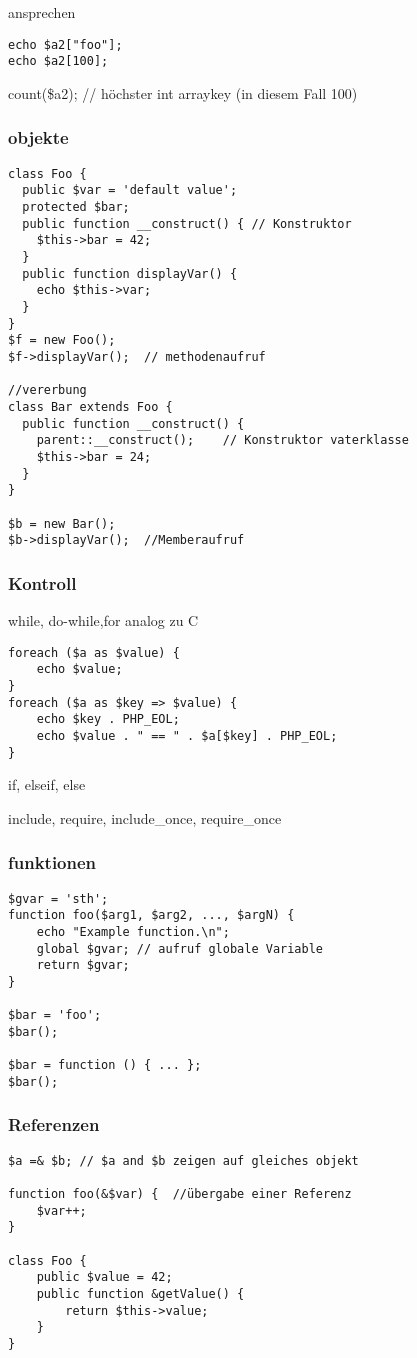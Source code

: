 ansprechen
\begin{verbatim}
echo $a2["foo"];
echo $a2[100];
\end{verbatim}

count(\$a2); // höchster int arraykey (in diesem Fall 100)

\subsubsection*{objekte}
\begin{verbatim}
class Foo {
  public $var = 'default value';
  protected $bar;
  public function __construct() { // Konstruktor
    $this->bar = 42;
  }
  public function displayVar() {
    echo $this->var;
  }
}
$f = new Foo();
$f->displayVar();  // methodenaufruf

//vererbung
class Bar extends Foo {
  public function __construct() {
    parent::__construct();    // Konstruktor vaterklasse
    $this->bar = 24;
  }
}

$b = new Bar();
$b->displayVar();  //Memberaufruf
\end{verbatim}

\subsubsection*{Kontroll}
while, do-while,for analog zu C
\begin{verbatim}
foreach ($a as $value) {
	echo $value;
}
foreach ($a as $key => $value) {
	echo $key . PHP_EOL;
	echo $value . " == " . $a[$key] . PHP_EOL;
}
\end{verbatim}

if, elseif, else

include, require, include_once, require_once

\subsubsection*{funktionen}
\begin{verbatim}
$gvar = 'sth';
function foo($arg1, $arg2, ..., $argN) {
	echo "Example function.\n";
	global $gvar; // aufruf globale Variable
	return $gvar;
}

$bar = 'foo';
$bar();

$bar = function () { ... };
$bar();
\end{verbatim}

\subsubsection*{Referenzen}
\begin{verbatim}
$a =& $b; // $a and $b zeigen auf gleiches objekt

function foo(&$var) {  //übergabe einer Referenz
	$var++;
}

class Foo {
	public $value = 42;
	public function &getValue() {
		return $this->value;
	}
}
\end{verbatim}

